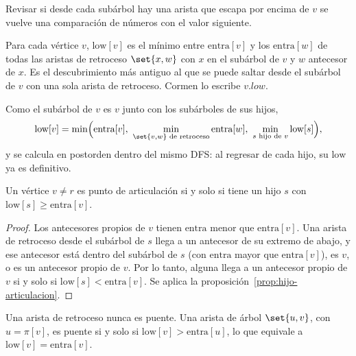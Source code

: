 \documentclass[11pt,letterpaper]{article}
\begin{document}
Revisar si desde cada subárbol hay una arista que escapa por encima de
$v$ se vuelve una comparación de números con el valor siguiente.

\begin{definicion}
  \label{def:low}
  Para cada vértice $v$, $\text{low}[v]$ es el mínimo entre
  $\text{entra}[v]$ y los $\text{entra}[w]$ de todas las aristas de
  retroceso $\set{x, w}$ con $x$ en el subárbol de $v$ y $w$ antecesor
  de $x$. Es el descubrimiento más antiguo al que se puede saltar desde
  el subárbol de $v$ con una sola arista de retroceso. Cormen lo
  escribe $v.\mathit{low}$.
\end{definicion}

Como el subárbol de $v$ es $v$ junto con los subárboles de sus hijos,
\[
  \text{low}[v] = \min\Bigl(\text{entra}[v],\
    \min_{\set{v, w} \text{ de retroceso}} \text{entra}[w],\
    \min_{s \text{ hijo de } v} \text{low}[s]\Bigr) ,
\]
y se calcula en postorden dentro del mismo DFS: al regresar de cada
hijo, su $\text{low}$ ya es definitivo.

\begin{corolario}
  \label{cor:articulacion-low}
  Un vértice $v \neq r$ es punto de articulación si y solo si tiene un
  hijo $s$ con $\text{low}[s] \ge \text{entra}[v]$.
\end{corolario}

\begin{proof}
  Los antecesores propios de $v$ tienen $\text{entra}$ menor que
  $\text{entra}[v]$. Una arista de retroceso desde el subárbol de $s$
  llega a un antecesor de su extremo de abajo, y ese antecesor está
  dentro del subárbol de $s$ (con $\text{entra}$ mayor que
  $\text{entra}[v]$), es $v$, o es un antecesor propio de $v$. Por lo
  tanto, alguna llega a un antecesor propio de $v$ si y solo si
  $\text{low}[s] < \text{entra}[v]$. Se aplica la
  proposición~\ref{prop:hijo-articulacion}.
\end{proof}

\begin{proposicion}
  \label{prop:puente-low}
  Una arista de retroceso nunca es puente. Una arista de árbol
  $\set{u, v}$, con $u = \pi[v]$, es puente si y solo si
  $\text{low}[v] > \text{entra}[u]$, lo que equivale a
  $\text{low}[v] = \text{entra}[v]$.
\end{proposicion}
\end{document}
